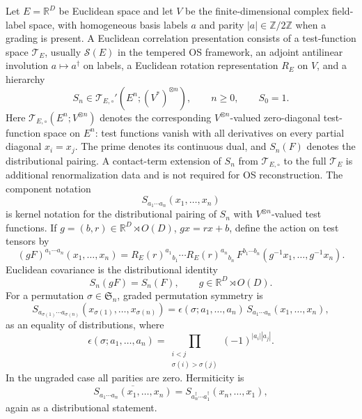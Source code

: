 \begin{definition}
\label{def:euclidean-correlation-presentation-opening}
  Let \(E=\mathbb R^D\) be Euclidean space and let \(V\) be the
  finite-dimensional complex field-label space, with homogeneous basis labels
  \(a\) and parity \(|a|\in\mathbb Z/2\mathbb Z\) when a grading is present.  A
  Euclidean correlation presentation consists of a test-function space
  \(\mathcal T_E\), usually \(\mathcal S(E)\) in the tempered OS framework, an
  adjoint antilinear involution \(a\mapsto a^\dagger\) on labels, a Euclidean
  rotation representation \(R_E\) on \(V\), and a hierarchy
  \[
    S_n\in\mathcal T_{E,\circ}'(E^n;(V^*)^{\otimes n}),
    \qquad n\ge0,\qquad S_0=1.
  \]
  Here \(\mathcal T_{E,\circ}(E^n;V^{\otimes n})\) denotes the corresponding
  \(V^{\otimes n}\)-valued zero-diagonal test-function space on \(E^n\): test
  functions vanish with all derivatives on every partial diagonal
  \(x_i=x_j\).  The prime denotes its continuous dual, and \(S_n(F)\) denotes
  the distributional pairing.  A contact-term extension of \(S_n\) from
  \(\mathcal T_{E,\circ}\) to the full \(\mathcal T_E\) is additional
  renormalization data and is not required for OS reconstruction.
  The component notation
  \[
    S_{a_1\cdots a_n}(x_1,\ldots,x_n)
  \]
  is kernel notation for the distributional pairing of \(S_n\) with
  \(V^{\otimes n}\)-valued test functions.  If
  \(g=(b,r)\in\mathbb R^D\rtimes O(D)\), \(gx=rx+b\), define the action on test
  tensors by
  \[
    (gF)^{a_1\cdots a_n}(x_1,\ldots,x_n)
    =
    R_E(r)^{a_1}{}_{b_1}\cdots R_E(r)^{a_n}{}_{b_n}\,
    F^{b_1\cdots b_n}(g^{-1}x_1,\ldots,g^{-1}x_n).
  \]
  Euclidean covariance is the distributional identity
  \[
    S_n(gF)=S_n(F),
    \qquad g\in\mathbb R^D\rtimes O(D).
  \]
  For a permutation \(\sigma\in\mathfrak S_n\), graded permutation symmetry is
  \[
    S_{a_{\sigma(1)}\cdots a_{\sigma(n)}}
    (x_{\sigma(1)},\ldots,x_{\sigma(n)})
    =
    \epsilon(\sigma;a_1,\ldots,a_n)\,
    S_{a_1\cdots a_n}(x_1,\ldots,x_n),
  \]
  as an equality of distributions, where
  \[
    \epsilon(\sigma;a_1,\ldots,a_n)
    =
    \prod_{\substack{i<j\\ \sigma(i)>\sigma(j)}}
    (-1)^{|a_i||a_j|}.
  \]
  In the ungraded case all parities are zero.  Hermiticity is
  \[
    \overline{
    S_{a_1\cdots a_n}(x_1,\ldots,x_n)}
    =
    S_{a_n^\dagger\cdots a_1^\dagger}(x_n,\ldots,x_1),
  \]
  again as a distributional statement.


\end{definition}
